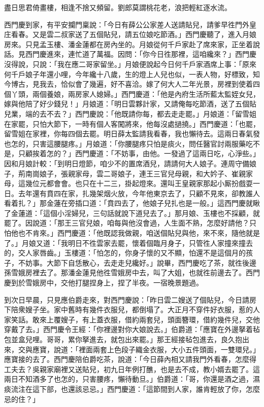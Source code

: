 盡日思君倚畫樓，相逢不捨又頻留。劉郎莫謂桃花老，浪把輕紅逐水流。

西門慶到家，有平安攔門稟說：「今日有薛公公家差人送請貼兒，請爹早徃門外皇庄看春。又是雲二叔家送了五個貼兒，請五位娘吃節酒。」西門慶聽了，進入月娘房來。只見孟玉樓、潘金蓮都在房內坐的。月娘從何千戶家赴了席來家，正坐着說話。見西門慶進來，連忙道了萬福。因問：「你今日徃那裡，這咱纔來？」西門慶沒得說，只說：「我在應二哥家留坐。」月娘便說起今日何千戶家酒席上事：「原來何千戶娘子年還小哩，今年纔十八歲，生的燈上人兒也似，一表人物，好標致，知今博古，見我去，恰似會了幾遍，好不喜洽。嫁了何大人二年光景，房裡到使着四個丫頭，兩個養娘，兩房家人媳婦。」西門慶道：「他是內府生活所藍太監姪女兒，嫁與他陪了好少錢兒！」月娘道：「明日雲夥計家，又請俺每吃節酒，送了五個貼兒業，端的去不去？」西門慶說：「他既請你每，都去走走罷。」月娘道：「留雪姐在家罷，只怕大節下，一時有個人客闖將來，他每沒處撾撓。」西門慶道：「也罷，留雪姐在家裡，你每四個去罷。明日薛太監請我看春，我也懶待去。這兩日春氣發也怎的，只害這腰腿疼。」月娘道：「你腰腿疼只怕是痰火，問任醫官討兩服藥吃不是，只顧挨着怎的？」西門慶道：「不妨事，由他。一發過了這兩日吃，心淨些。」因和月娘計較：「到明日燈節，咱少不的置席酒兒，請請何大人娘子。連周守備娘子，荊南崗娘子，張親家母，雲二哥娘子，連王三官兒母親，和大妗子、崔親家母，這幾位元都會會。也只在十二三，掛起燈來。還叫王皇親家那起小厮扮戲耍一日。去年還有賁四在家，扎幾架烟火放，今年他東京去了，只顧不見來，卻教誰人看着扎？」那金蓮在旁插口道：「賁四去了，他娘子兒扎也是一般。」{}這西門慶就瞅了金蓮道：「這個小淫婦兒，三句話就說下道兒去了。」那月娘、玉樓也不採顧，就罷了。因說道：「那王三官兒娘，咱每與他沒會過，人生面不熟，怎麼好請他？只怕他也不肯來。」西門慶道：「他既認我做親，咱送個貼兒與他，來不來，隨他就是了。」月娘又道：「我明日不徃雲家去罷，懷着個臨月身子，只管徃人家撞來撞去的，交人家唇齒。」玉樓道：「怕怎的，你身子懷的又不顯，怕還不是這個月的孩子，不妨事。大節下自恁散心，去走走兒纔好。」說畢，西門慶吃了茶，就徃後邊孫雪娥房裡去了。那潘金蓮見他徃雪娥房中去，叫了大姐，也就徃前邊去了。西門慶到於雪娥房中，交他打腿捏身上，捏了半夜。{}一宿晚景題過。

到次日早晨，只見應伯爵走來，對西門慶說：「昨日雲二嫂送了個貼兒，今日請房下陪衆嫂子坐。家中舊時有幾件衣服兒，都倒塌了。大正月不穿件好衣服，惹的人家笑話。敢來上覆嫂子，有上蓋衣服，借約兩套兒，頭面簪環，借約幾件兒，交他穿戴了去。」西門慶令王經：「你裡邊對你大娘說去。」伯爵道：「應寶在外邊拏着毡包並盒兒哩。哥哥，累你拏進去，就包出來罷。」那王經接毡包進去，良久抱出來，交與應寶，說道：「裡面兩套上色段子織金衣服，大小五件頭面，一雙環兒。」{}應寶接的去了。西門慶陪伯爵吃茶，說道：「今日薛內相又請我門外看春，怎麼得工夫去？吳親家廟裡又送貼兒，初九日年例打醮，也是去不成，教小婿去罷了。這兩日不知酒多了也怎的，只害腰疼，懶待動旦。」伯爵道：「哥，你還是酒之過，濕痰流注在這下部，也還該忌忌。」西門慶道：「這節間到人家，誰肯輕放了你，怎麼忌的住？」

